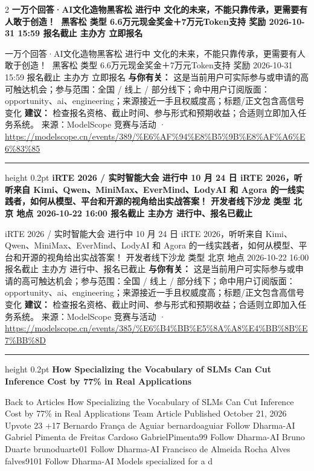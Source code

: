 \documentclass[10.5pt]{ctexart}
\begin{document}
\begin{multicols}{2}
{\large\bfseries 一万个回答·AI文化造物黑客松 进行中 文化的未来，不能只靠传承，更需要有人敢于创造！👋 黑客松 类型 6.6万元现金奖金＋7万元Token支持 奖励 2026-10-31 15:59 报名截止 主办方 立即报名}\par
一万个回答·AI文化造物黑客松 进行中 文化的未来，不能只靠传承，更需要有人敢于创造！👋 黑客松 类型 6.6万元现金奖金＋7万元Token支持 奖励 2026-10-31 15:59 报名截止 主办方 立即报名
\textbf{与你有关：} 这是当前用户可实际参与或申请的高可触达机会；参与范围：全国 / 线上 / 部分线下；命中用户订阅版面：opportunity、ai、engineering；来源接近一手且权威度高；标题/正文包含高信号变化
\textbf{建议：} 检查报名资格、截止时间、参与形式和预期收益；合适则立即加入任务系统。
{\footnotesize\color{ormuted} 来源：ModelScope 竞赛与活动 · \url{https://modelscope.cn/events/389/%E6%AF%94%E8%B5%9B%E8%AF%A6%E6%83%85}}
\vspace{2mm}
\hrule height 0.2pt
\vspace{2mm}
{\large\bfseries iRTE 2026 / 实时智能大会 进行中 10 月 24 日 iRTE 2026，听听来自 Kimi、Qwen、MiniMax、EverMind、LodyAI 和 Agora 的一线实践者，如何从模型、平台和开源的视角给出实战答案！ 开发者线下沙龙 类型 北京 地点 2026-10-22 16:00 报名截止 主办方 进行中、报名已截止}\par
iRTE 2026 / 实时智能大会 进行中 10 月 24 日 iRTE 2026，听听来自 Kimi、Qwen、MiniMax、EverMind、LodyAI 和 Agora 的一线实践者，如何从模型、平台和开源的视角给出实战答案！ 开发者线下沙龙 类型 北京 地点 2026-10-22 16:00 报名截止 主办方 进行中、报名已截止
\textbf{与你有关：} 这是当前用户可实际参与或申请的高可触达机会；参与范围：全国 / 线上 / 部分线下；命中用户订阅版面：opportunity、ai、engineering；来源接近一手且权威度高；标题/正文包含高信号变化
\textbf{建议：} 检查报名资格、截止时间、参与形式和预期收益；合适则立即加入任务系统。
{\footnotesize\color{ormuted} 来源：ModelScope 竞赛与活动 · \url{https://modelscope.cn/events/385/%E6%B4%BB%E5%8A%A8%E4%BB%8B%E7%BB%8D}}
\vspace{2mm}
\hrule height 0.2pt
\vspace{2mm}
{\large\bfseries How Specializing the Vocabulary of SLMs Can Cut Inference Cost by 77\% in Real Applications}\par
Back to Articles How Specializing the Vocabulary of SLMs Can Cut Inference Cost by 77\% in Real Applications Team Article Published October 21, 2026 Upvote 23 +17 Bernardo França de Aguiar bernardoaguiar Follow Dharma-AI Gabriel Pimenta de Freitas Cardoso GabrielPimenta99 Follow Dharma-AI Bruno Duarte brunoduarte01 Follow Dharma-AI Francisco de Almeida Rocha Alves falves9101 Follow Dharma-AI Models specialized for a d

\end{multicols}
\end{document}
